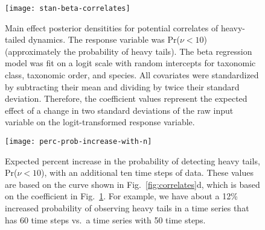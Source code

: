 \clearpage


\begin{figure}[htbp]
\begin{center}
\texttt{[image: stan-beta-correlates]}
\caption{
  Main effect posterior densitities for potential correlates of heavy-tailed dynamics.
  The response variable was Pr($\nu < 10$) (approximately the probability of heavy tails).
  The beta regression model was fit on a logit scale with random intercepts for taxonomic class, taxonomic order, and species.
  All covariates were standardized by subtracting their mean and dividing by twice their standard deviation. Therefore, the coefficient values represent the expected effect of a change in two standard deviations of the raw input variable on the logit-transformed response variable.
}
    \label{fig:correlate-coefs}
\end{center}
\end{figure}

\begin{figure}[htbp]
\begin{center}
\texttt{[image: perc-prob-increase-with-n]}
\caption{
Expected percent increase in the probability of detecting heavy tails, Pr($\nu < 10$), with an additional ten time steps of data.
These values are based on the curve shown in Fig.~\ref{fig:correlates}d, which is based on the coefficient in Fig.~\ref{fig:correlate-coefs}.
For example, we have about a 12\% increased probability of observing heavy tails in a time series that has 60 time steps vs.\ a time series with 50 time steps.
}
\label{fig:perc-inc-p}
\end{center}
\end{figure}

